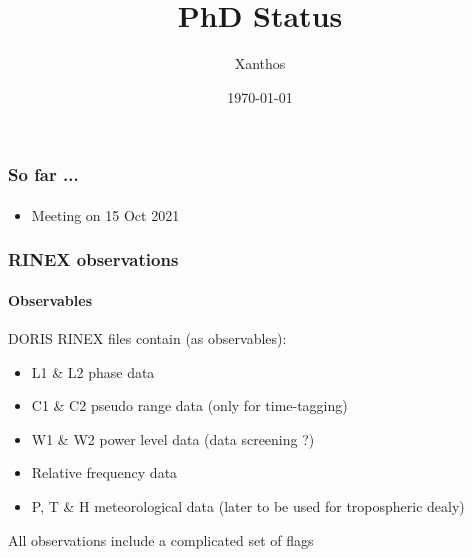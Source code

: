\documentclass{beamer}
\title[]{PhD Status}
\author{Xanthos}
\institute{DSO \& IGN}
\date{\today}
\newcommand{\citem}{\item[\checkmark]}
\newcommand{\bitem}{\item[\textbullet]}
\begin{document}
\begin{frame}
  \titlepage
\end{frame}


\begin{frame}\frametitle{So far ...}\framesubtitle{}
  \begin{itemize}
    \citem Meeting on 15 Oct 2021
  \end{itemize}
\end{frame}

\begin{frame}\frametitle{RINEX observations}\framesubtitle{Observables}
  DORIS RINEX files contain (as observables):
  \begin{itemize}
    \bitem L1 \& L2 phase data
    \bitem C1 \& C2 pseudo range data (only for time-tagging)
    \bitem W1 \& W2 power level data (data screening ?)
    \bitem Relative frequency data
    \bitem P, T \& H meteorological data (later to be used for tropospheric dealy)
  \end{itemize}
  \vspace{.2cm}

  All observations include a complicated set of flags\\
  \vspace{.2cm}
\end{frame}
\end{document}
